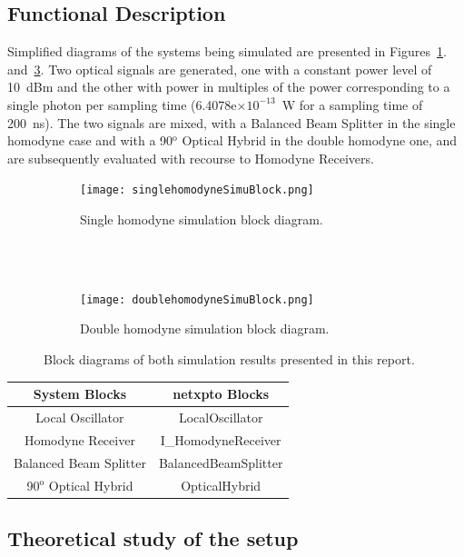 \subsection*{Functional Description}

Simplified diagrams of the systems being simulated are presented in Figures~\ref{fig:singleH}. and~\ref{fig:doubleH}. Two optical signals are generated, one with a constant power level of 10~dBm and the other with power in multiples of the power corresponding to a single photon per sampling time (6.4078e$\times10^{-13}$~W for a sampling time of 200~ns). The two signals are mixed, with a Balanced Beam Splitter in the single homodyne case and with a 90$^\text{o}$ Optical Hybrid in the double homodyne one, and are subsequently evaluated with recourse to Homodyne Receivers.

\begin{figure}[h]
\centering
\begin{subfigure}{\linewidth}
\texttt{[image: singlehomodyneSimuBlock.png]}
\caption{Single homodyne simulation block diagram.}
\label{fig:singleH}
\end{subfigure}
\\
~
\\
\begin{subfigure}{\linewidth}
\texttt{[image: doublehomodyneSimuBlock.png]}
\caption{Double homodyne simulation block diagram.}
\label{fig:doubleH}
\end{subfigure}
\caption{Block diagrams of both simulation results presented in this report.}
\end{figure}

\begin{table}[H]
\centering
\begin{tabular}{c|c}
System Blocks          & netxpto Blocks       \\ \hline
Local Oscillator       & LocalOscillator      \\
Homodyne Receiver      & I\_HomodyneReceiver   \\
Balanced Beam Splitter & BalancedBeamSplitter \\
90$^\text{o}$ Optical Hybrid     & OpticalHybrid
\end{tabular}
\end{table}

\pagebreak

\subsection*{Theoretical study of the setup}

